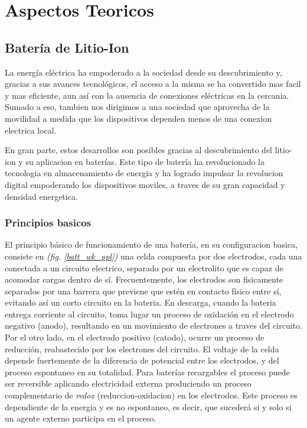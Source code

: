 \documentclass[10pt,a4paper]{article}
\begin{document}
	\clearpage
	
    \section{Aspectos Teoricos}\label{teoria}
	
	\subsection{Batería de Litio-Ion}
    
    La energía eléctrica ha empoderado a la sociedad desde su 
    descubrimiento y, gracias a sus avances tecnológicos, el acceso a la misma 
    se ha convertido mas facil y mas eficiente, aun así con la
    ausencia de conexiones eléctricas en la cercania. Sumado a eso, tambien
    nos dirigimos a una sociedad que aprovecha de la movilidad a medida que los
    dispositivos dependen menos de una conexion electrica local.
    
    \noindent En gran parte, estos desarrollos son posibles gracias al
    descubrimiento del litio-ion y su aplicacion en baterías. Este tipo de
    batería ha revolucionado la tecnologia en almacenamiento de energia y ha
    logrado impulsar la revolucion digital empoderando los dispositivos moviles,
    a traves de su gran capacidad y densidad energetica.

    \subsubsection{Principios basicos}

    El principio básico de funcionamiento de una batería, en su configuracion
    basica, consiste en \emph{(fig. \ref{batt_wk_ppl})} una celda 
    compuesta por dos electrodos, cada una conectada a un circuito 
    electrico, separado por un electrolito que es capaz de acomodar cargas
    dentro de sí. Frecuentemente, los electrodos son fisicamente separados por
    una barrera que previene que estén en contacto físico entre sí, evitando así
    un corto circuito en la bateria. En descarga, cuando la bateria
    entrega corriente al circuito, toma lugar un proceso de oxidación en el
    electrodo negativo (anodo), resultando en un movimiento de electrones a
    traves del circuito. Por el otro lado, en el electrodo positivo (catodo),
    ocurre un proceso de reducción, reabastecido por los electrones del
    circuito. El voltaje de la celda depende fuertemente de la diferencia de
    potencial entre los electrodos, y del proceso espontaneo en su totalidad.
    Para baterías recargables el proceso puede ser reversible aplicando
    electricidad externa produciendo un proceso complementario de \emph{redox}
    (reduccion-oxidacion) en los electrodos. Este proceso es dependiente de la
    energia y es no espontaneo, es decir, que sucederá si y solo si un agente
    externo participa en el proceso.
\end{document}
